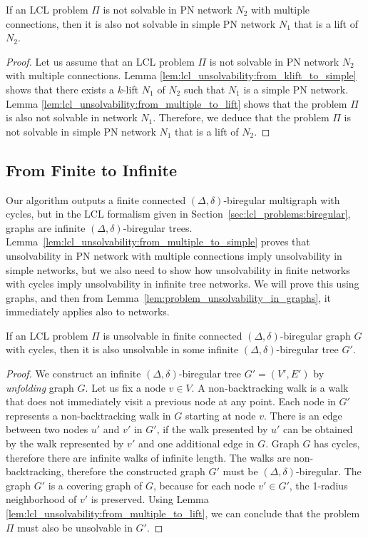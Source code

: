 \begin{lemma} \label{lem:lcl_unsolvability:from_multiple_to_simple}
    If an LCL problem $\Pi$ is not solvable in PN network $N_2$ with multiple connections, then it is also not solvable in simple PN network $N_1$ that is a lift of $N_2$.
\end{lemma}
\begin{proof}
    Let us assume that an LCL problem $\Pi$ is not solvable in PN network $N_2$ with multiple connections.
    Lemma \ref{lem:lcl_unsolvability:from_klift_to_simple} shows that there exists a $k$-lift $N_1$ of $N_2$ such that $N_1$ is a simple PN network.
    Lemma \ref{lem:lcl_unsolvability:from_multiple_to_lift} shows that the problem $\Pi$ is also not solvable in network $N_1$.
    Therefore, we deduce that the problem $\Pi$ is not solvable in simple PN network $N_1$ that is a lift of $N_2$.
\end{proof}


\subsection{From Finite to Infinite} \label{sec:algorithm:from_finite_to_infinite}
Our algorithm outputs a finite connected $(\Delta, \delta)$-biregular multigraph with cycles, but in the LCL formalism given in Section~\ref{sec:lcl_problems:biregular}, graphs are infinite $(\Delta, \delta)$-biregular trees.
Lemma~\ref{lem:lcl_unsolvability:from_multiple_to_simple} proves that unsolvability in PN network with multiple connections imply unsolvability in simple networks, but we also need to show how unsolvability in finite networks with cycles imply unsolvability in infinite tree networks.
We will prove this using graphs, and then from Lemma~\ref{lem:problem_unsolvability_in_graphs}, it immediately applies also to networks.

\begin{lemma} \label{lem:from_finite_to_infinite}
    If an LCL problem $\Pi$ is unsolvable in finite connected $(\Delta, \delta)$-biregular graph $G$ with cycles, then it is also unsolvable in some infinite $(\Delta, \delta)$-biregular tree $G'$.
\end{lemma}
\begin{proof}
    We construct an infinite $(\Delta, \delta)$-biregular tree $G'=(V', E')$ by \emph{unfolding} graph $G$.
    Let us fix a node $v \in V$.
    A non-backtracking walk is a walk that does not immediately visit a previous node at any point.
    Each node in $G'$ represents a non-backtracking walk in $G$ starting at node $v$.
    There is an edge between two nodes $u'$ and $v'$ in $G'$, if the walk presented by $u'$ can be obtained by the walk represented by $v'$ and one additional edge in $G$.
    Graph $G$ has cycles, therefore there are infinite walks of infinite length.
    The walks are non-backtracking, therefore the constructed graph $G'$ must be $(\Delta, \delta)$-biregular.
    The graph $G'$ is a covering graph of $G$, because for each node $v' \in G'$, the 1-radius neighborhood of $v'$ is preserved.
    Using Lemma \ref{lem:lcl_unsolvability:from_multiple_to_lift}, we can conclude that the problem $\Pi$ must also be unsolvable in $G'$.
\end{proof}

